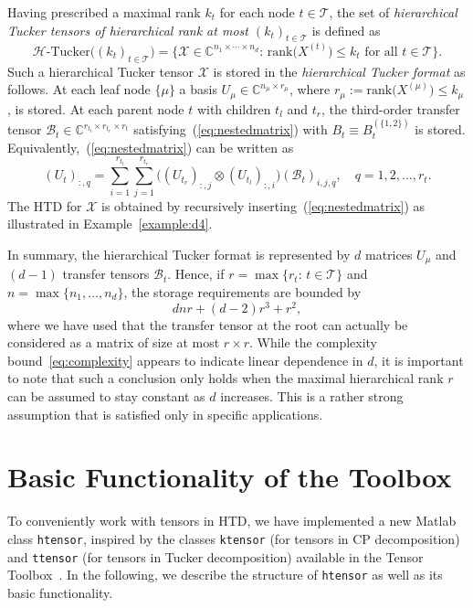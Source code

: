 \documentclass[11pt, a4paper]{article}
\newcommand{\calB}{\mathcal{B}}
\newcommand{\calT}{\mathcal{T}}
\newcommand{\calX}{\mathcal{X}}
\newcommand{\C}{{\mathbb C}}
\newcommand{\HTucker}{\mathcal H\text{-Tucker}}
\begin{document}
Having prescribed a maximal rank $k_t$ for each node $t \in \calT$, the set of \emph{hierarchical Tucker tensors of
hierarchical rank at most $(k_t)_{t\in\calT}$} is defined as
\[
 \HTucker\big( (k_t)_{t\in\calT} \big) = \Big\{ \calX \in \C^{n_1\times\cdots\times n_d}:\,\text{rank}\big(
X^{(t)} \big) \le k_t \text{ for all } t\in \calT
\Big\}.
\]
Such a hierarchical Tucker tensor $\calX$ is stored in the \emph{hierarchical Tucker format} as follows.
At each leaf node $\{\mu\}$ a basis $U_{\mu} \in \C^{n_\mu \times r_\mu}$, where
$r_\mu := \text{rank}\big(X^{(\mu)}\big) \le k_\mu$, is stored.
At each parent node $t$ with children $t_l$ and $t_r$, the third-order transfer tensor $\calB_t \in \C^{r_{t_l} \times r_{t_r} \times r_t}$ satisfying~(\ref{eq:nestedmatrix}) with $B_t \equiv B_t^{(\{1,2\})}$ is stored. Equivalently,~(\ref{eq:nestedmatrix}) can be written as
\begin{equation} \label{eq:generalrecursion}
(U_t)_{:,q} = \sum_{i=1}^{r_{t_l}} \sum_{j=1}^{r_{t_r}}
\Big( (U_{t_r})_{:, j} \otimes (U_{t_l})_{:, i} \Big)
(\calB_t)_{i, j, q}, \quad q = 1,2,\ldots,r_t. 
\end{equation}
The HTD for $\calX$ is obtained by recursively inserting~(\ref{eq:nestedmatrix}) as illustrated in
Example~\ref{example:d4}.

In summary, the hierarchical Tucker format is represented by $d$ matrices $U_\mu$ and $(d-1)$
transfer tensors $\calB_t$. 
Hence, if $r = \max\{r_t:\,t\in \calT \}$ and $n = \max\{n_1,\ldots,n_d\}$, the storage
requirements are bounded by
\begin{equation} \label{eq:complexity}
 dnr + (d-2) r^3 + r^2,
\end{equation}
where we have used that the transfer tensor at the root can actually be considered as a matrix of size at most $r\times r$. While the complexity bound~\eqref{eq:complexity} appears to indicate linear dependence in $d$, it is important to note that such a conclusion only
holds when the maximal hierarchical rank $r$ can be assumed to stay constant as $d$ increases. This is a rather strong assumption that is satisfied only in specific applications.

\section{Basic Functionality of the Toolbox} \label{sec:basicfunctionality}

To conveniently work with tensors in HTD, we have implemented a new {\sc Matlab}
class {\tt htensor}, inspired by the classes {\tt ktensor} (for tensors in CP decomposition)
and {\tt ttensor} (for tensors in Tucker decomposition) available in the Tensor Toolbox~\cite{BadK06}. 
In the following, we describe the structure of {\tt htensor} as well as its
basic functionality.
\end{document}

